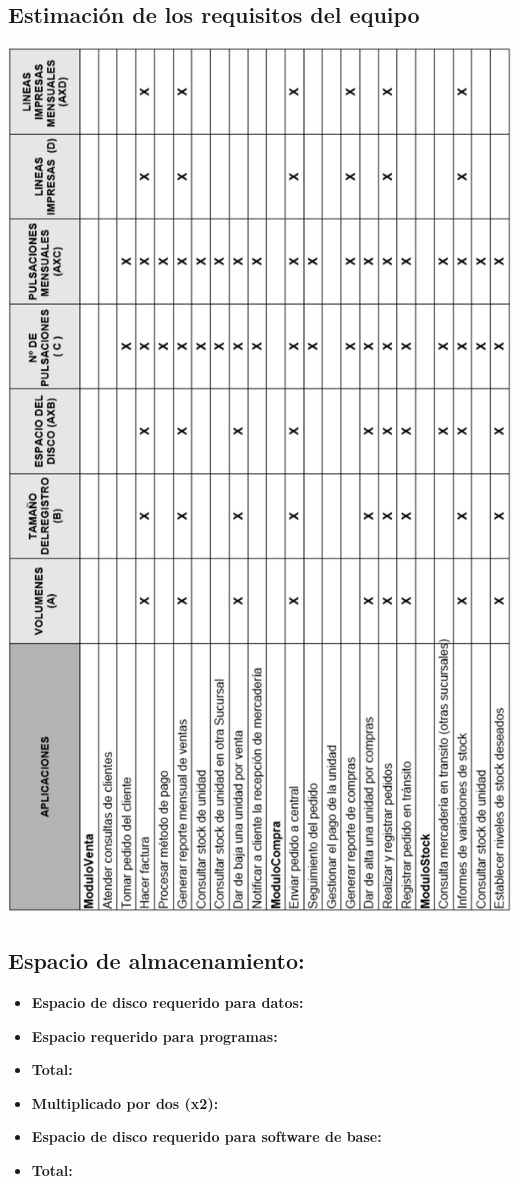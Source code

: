 \subsection{Estimación de los requisitos del equipo}

\begin{center}
\includegraphics[width=550px,angle=90]{fase2/volumenes_datos/volumenes_de_datos.pdf}
\end{center}

\subsection{Espacio de almacenamiento:}
\begin{itemize}
  \item \textbf{Espacio de disco requerido para datos:}
  \item \textbf{Espacio requerido para programas:}
  \item \textbf{Total:}
  \item \textbf{Multiplicado por dos (x2):}
  \item \textbf{Espacio de disco requerido para software de base:}
  \item \textbf{Total:}
\end{itemize}

